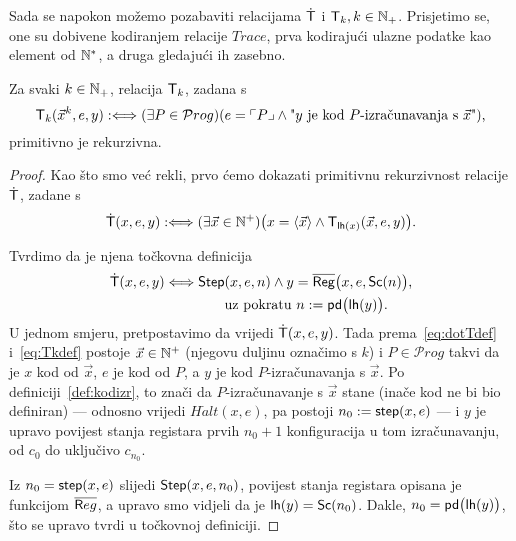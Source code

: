Sada se napokon možemo pozabaviti relacijama $\mathsf{\dot T}$ i $\mathsf T_k,k\in{\mathbb N}_+$. Prisjetimo se, one su dobivene kodiranjem relacije $Trace$, prva kodirajući ulazne podatke kao element od ${\mathbb N}^*$, a druga gledajući ih zasebno. 

\begin{propozicija}\label{prop:Tkprn}
Za svaki $k\in{\mathbb N}_+$, relacija $\mathsf T_k$, zadana s
\begin{equation}\label{eq:Tkdef}
    \mathsf T_k(\vec x^k,e,y):\Longleftrightarrow(\exists P\in\mathcal Prog)(e=\ulcorner P\lrcorner\land \text{"$y$ je kod $P$-izračunavanja s $\vec x$"})\text,
\end{equation}
primitivno je rekurzivna.
\end{propozicija}
\begin{proof}
Kao što smo već rekli, prvo ćemo dokazati primitivnu rekurzivnost relacije $\mathsf{\dot T}$, zadane s
\begin{equation}\label{eq:dotTdef}
    \mathsf{\dot T}(x,e,y):\Longleftrightarrow(\exists\vec x\in{\mathbb N}^+)\bigl(x=\langle\vec x\rangle\land\mathsf T_{\mathsf{lh}(x)}(\vec x,e,y)\bigr)\text.
\end{equation}

Tvrdimo da je njena točkovna definicija
\begin{align}
    \dot{\mathsf T}(x,e,y)\Longleftrightarrow\mathsf{Step}&(x,e,n)\land y=\overline{\mathsf{Reg}}\bigl(x,e,\mathsf{Sc}(n)\bigr)\text,\\
    &\text{uz pokratu }n:=\mathsf{pd}\big(\mathsf{lh}(y)\bigr)\text.
\end{align}
U jednom smjeru, pretpostavimo da vrijedi $\mathsf{\dot T}(x,e,y)$. Tada prema~\eqref{eq:dotTdef} i~\eqref{eq:Tkdef} postoje $\vec x\in{\mathbb N}^+$ (njegovu duljinu označimo s $k$) i $P\in\mathcal Prog$ takvi da je $x$ kod od $\vec x$, $e$ je kod od $P$, a $y$ je kod $P$-izračunavanja s $\vec x$. Po definiciji~\ref{def:kodizr}, to znači da $P$-izračunavanje s $\vec x$ stane (inače kod ne bi bio definiran) --- odnosno vrijedi $H\dot alt(x,e)$, pa postoji $n_0:=\mathsf{step}(x,e)$ --- i $y$ je upravo povijest stanja registara prvih $n_0+1$ konfiguracija u tom izračunavanju, od $c_0$ do uključivo $c_{n_0}$.

Iz $n_0=\mathsf{step}(x,e)$ slijedi $\mathsf{Step}(x,e,n_0)$, povijest stanja registara opisana je funkcijom $\overline{\mathsf Reg}$, a upravo smo vidjeli da je $\mathsf{lh}(y)=\mathsf{Sc}(n_0)$. Dakle, $n_0=\mathsf{pd}\bigl(\mathsf{lh}(y)\bigr)$, što se upravo tvrdi u točkovnoj definiciji.


\end{proof}
